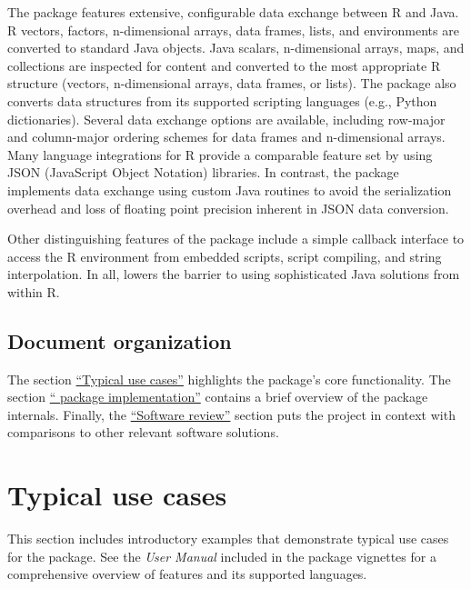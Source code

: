 The  package features extensive, configurable data exchange between R and Java. R vectors, factors, n-dimensional arrays, data frames, lists, and environments are converted to standard Java objects. Java scalars, n-dimensional arrays, maps, and collections are inspected for content and converted to the most appropriate R structure (vectors, n-dimensional arrays, data frames, or lists). The  package also converts data structures from its supported scripting languages (e.g., Python dictionaries). Several data exchange options are available, including row-major and column-major ordering schemes for data frames and n-dimensional arrays. Many language integrations for R provide a comparable feature set by using JSON (JavaScript Object Notation) libraries. In contrast, the  package implements data exchange using custom Java routines to avoid the serialization overhead and loss of floating point precision inherent in JSON data conversion.

Other distinguishing features of the  package include a simple callback interface to access the R environment from embedded scripts, script compiling, and string interpolation. In all,  lowers the barrier to using sophisticated Java solutions from within R.

\subsection{Document organization}

The section \hyperlink{typical-use-cases}{``Typical use cases''} highlights the  package's core functionality. The section \hyperlink{the-jsr223-package-implementation}{`` package implementation''} contains a brief overview of the package internals. Finally, the  \hyperlink{software-review}{``Software review''} section puts the  project in context with comparisons to other relevant software solutions.

\hypertarget{typical-use-cases}{}
\section{Typical use cases}

This section includes introductory examples that demonstrate typical use cases for the  package. See the \textit{ User Manual} included in the package vignettes for a comprehensive overview of  features and its supported languages.

